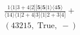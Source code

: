 \documentclass[varwidth, border=5pt]{standalone}
\begin{document}
\begin{my}
$\begin{gathered}
\scriptscriptstyle\frac{1⟨1|3+4|2][𝟓|𝟓|1⟩⟨4𝟓⟩}{⟨14⟩⟨1|2+4|3]⟨1|2+3|4]} +\\
\scriptscriptstyle(43215,\;\text{True},\;-) \phantom{+}
\end{gathered}$
\end{my}
\end{document}

